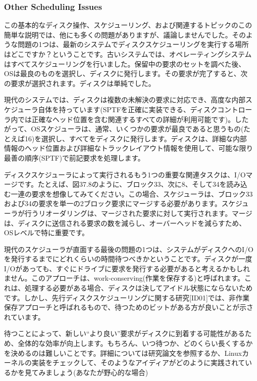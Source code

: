\hypertarget{other-scheduling-issues}{%
\subsubsection*{Other Scheduling Issues}\label{other-scheduling-issues}}

この基本的なディスク操作、スケジューリング、および関連するトピックのこの簡単な説明では、他にも多くの問題がありますが、議論しませんでした。そのような問題の1つは、最新のシステムでディスクスケジューリングを実行する場所はどこですか？ということです。古いシステムでは、オペレーティングシステムはすべてスケジューリングを行いました。保留中の要求のセットを調べた後、OSは最良のものを選択し、ディスクに発行します。その要求が完了すると、次の要求が選択されます。ディスクは単純でした。

現代のシステムでは、ディスクは複数の未解決の要求に対応でき、高度な内部スケジューラ自体を持っています(SPTFを正確に実装できる、ディスクコントローラ内では正確なヘッド位置を含む関連するすべての詳細が利用可能です)。したがって、OSスケジューラは、通常、いくつかの要求が最良であると思うもの(たとえば16)を選択し、すべてをディスクに発行します。ディスクは、詳細な内部情報のヘッド位置および詳細なトラックレイアウト情報を使用して、可能な限り最善の順序(SPTF)で前記要求を処理します。

ディスクスケジューラによって実行されるもう1つの重要な関連タスクは、I/Oマージです。たとえば、図37.8のように、ブロック33、次に8、そして34を読み込む一連の要求を想像してみてください。この場合、スケジューラは、ブロック33および34の要求を単一の2ブロック要求にマージする必要があります。スケジューラが行うリオーダリングは、マージされた要求に対して実行されます。マージは、ディスクに送信される要求の数を減らし、オーバーヘッドを減らすため、OSレベルで特に重要です。

現代のスケジューラが直面する最後の問題の1つは、システムがディスクへのI/Oを発行するまでにどれくらいの時間待つべきかということです。ディスクが一度I/Oがあっても、すぐにドライブに要求を発行する必要があると考えるかもしれません。このアプローチは、work-conserving(作業を保存する)と呼ばれます。これは、処理する必要がある場合、ディスクは決してアイドル状態にならないためです。しかし、先行ディスクスケジューリングに関する研究{[}ID01{]}では、非作業保存アプローチと呼ばれるもので、待つためのビットがある方が良いことが示されています。

待つことによって、新しい``より良い''要求がディスクに到着する可能性があるため、全体的な効率が向上します。もちろん、いつ待つか、どのくらい長くするかを決めるのは難しいことです。詳細については研究論文を参照するか、Linuxカーネルの実装をチェックして、そのようなアイディアがどのように実践されているかを見てみましょう(あなたが野心的な場合)

